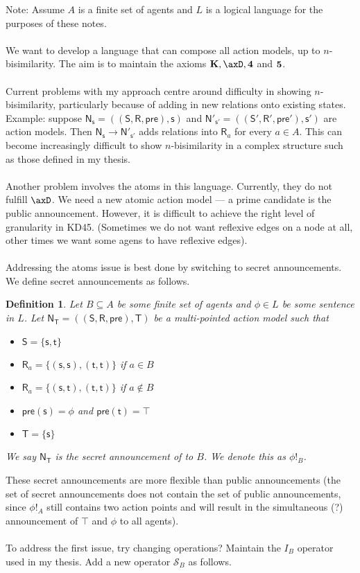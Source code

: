 \documentclass{cshonours}
\newtheorem{defn}{Definition}[chapter]
\numberwithin{equation}{chapter}
\newcommand{\axK}{\ensuremath{\bf K}}
\newcommand{\axFo}{\ensuremath{\bf 4}}
\newcommand{\axFi}{\ensuremath{\bf 5}}
\newcommand{\aMod}[1]{
  \ensuremath {\mathrm{\mathsf{#1}}}
}
\newcommand{\evMo}{\aMod{N}}
\newcommand{\evM}{\evMo}
\newcommand{\evS}{\aMod{S}}
\newcommand{\evR}{\aMod{R}}
\newcommand{\evpr}{\aMod{pre}}
\newcommand{\evT}{\aMod{T}}
\newcommand{\evs}{\aMod{s}}
\newcommand{\evt}{\aMod{t}}
\begin{document}
Note: Assume $A$ is a finite set of agents and $L$ is a logical language for the purposes of these
notes.\\
\\
We want to develop a language that can compose all action models, up to $n$-bisimilarity.
The aim is to maintain the axioms $\axK, \axD, \axFo$ and $\axFi$.\\
\\
Current problems with my approach centre around difficulty in showing $n$-bisimilarity, particularly
because of adding in new relations onto existing states.
Example: suppose $\evM_\evs = ((\evS, \evR, \evpr), \evs)$ and $\evM'_{\evs'} = ((\evS', \evR',
\evpr'), \evs')$ are action models.
Then $\evM_\evs \to \evM'_{\evs'}$ adds relations into $\evR_a$ for every $a \in A$.
This can become increasingly difficult to show $n$-bisimilarity in a complex structure such as those
defined in my thesis.\\
\\
Another problem involves the atoms in this language.
Currently, they do not fulfill $\axD$.
We need a new atomic action model --- a prime candidate is the public announcement.
However, it is difficult to achieve the right level of granularity in KD45.
(Sometimes we do not want reflexive edges on a node at all, other times we want some agens to have
reflexive edges).\\
\\
Addressing the atoms issue is best done by switching to secret announcements.
We define secret announcements as follows.
\begin{defn}
	Let $B \subseteq A$ be some finite set of agents and $\phi \in L$ be some sentence in $L$.
	Let $\evM_\evT = ((\evS, \evR, \evpr), \evT)$ be a multi-pointed action model such that
	\begin{itemize}
		\item $\evS = \{\evs, \evt\}$
		\item $\evR_a = \{(\evs, \evs), (\evt, \evt)\}$ if $a \in B$
		\item $\evR_a = \{(\evs, \evt), (\evt, \evt)\}$ if $a \notin B$
		\item $\evpr(\evs) = \phi$ and $\evpr(\evt) = \top$
		\item $\evT = \{\evs\}$
	\end{itemize}
	We say $\evM_\evT$ is the {\em secret announcement of \phi to $B$}.
	We denote this as $\phi!_B$.
\end{defn}

These secret announcements are more flexible than public announcements (the set of secret
announcements does not contain the set of public announcements, since $\phi!_A$ still contains two
action points and will result in the simultaneous (?) announcement of $\top$ and $\phi$ to all
agents).\\
\\
To address the first issue, try changing operations?
Maintain the $I_B$ operator used in my thesis.
Add a new operator $\mathcal{S}_B$ as follows.
\end{document}

